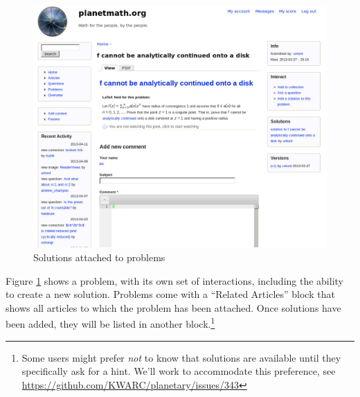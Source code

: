 \FloatBarrier

\begin{vplace}[0.7]
\begin{figure}[h]
\begin{center}
\includegraphics[width=.85\textwidth]{./inputs/ProblemOne.png}
\end{center}
\caption{Solutions attached to problems \label{ProblemOne}}
\end{figure}
\bigskip

Figure \ref{ProblemOne} shows a problem, with its own set of
interactions, including the ability to create a new solution.
Problems come with a ``Related Articles'' block that shows all
articles to which the problem has been attached.  Once solutions have
been added, they will be listed in another block.\footnote{Some users
  might prefer \emph{not} to know that solutions are available until
  they specifically ask for a hint.  We'll work to accommodate this
  preference, see \url{https://github.com/KWARC/planetary/issues/343}}
\end{vplace}

\newpage
\FloatBarrier

